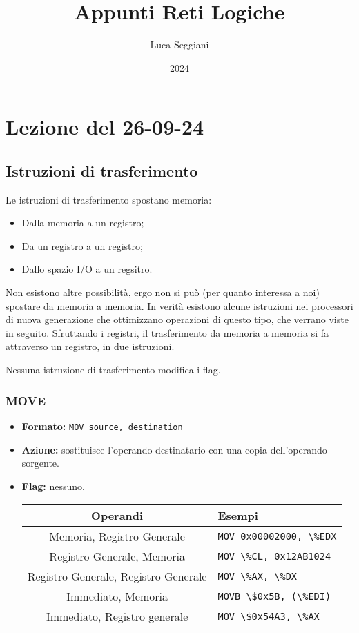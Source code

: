 \documentclass[a4paper,11pt]{article}
\title{Appunti Reti Logiche}
\author{Luca Seggiani}
\date{2024}
\begin{document}
\section{Lezione del 26-09-24}

\thispagestyle{empty}
\pagestyle{fancy}

\subsection{Istruzioni di trasferimento}
Le istruzioni di trasferimento spostano memoria:
\begin{itemize}
	\item Dalla memoria a un registro;
	\item Da un registro a un registro;
	\item Dallo spazio I/O a un regsitro.
\end{itemize}

Non esistono altre possibilità, ergo non si può (per quanto interessa a noi) spostare da memoria a memoria.
In verità esistono alcune istruzioni nei processori di nuova generazione che ottimizzano operazioni di questo tipo, che verrano viste in seguito.
Sfruttando i registri, il trasferimento da memoria a memoria si fa attraverso un registro, in due istruzioni.

Nessuna istruzione di trasferimento modifica i flag.

\subsubsection{MOVE}
\begin{itemize}
	\item \textbf{Formato:} \lstinline|MOV source, destination|
	\item \textbf{Azione:} sostituisce l'operando destinatario con una copia dell'operando sorgente.
	\item \textbf{Flag:} nessuno.

		\begin{table}[h!]
			\center {}
			\begin{tabular} { c | p{5cm} }
				\bfseries Operandi & \bfseries Esempi \\
				\hline 
				Memoria, Registro Generale & \lstinline|MOV 0x00002000, \%EDX| \\
				Registro Generale, Memoria & \lstinline|MOV \%CL, 0x12AB1024| \\
				Registro Generale, Registro Generale & \lstinline|MOV \%AX, \%DX| \\
				Immediato, Memoria & \lstinline|MOVB \$0x5B, (\%EDI)| \\ 
				Immediato, Registro generale & \lstinline|MOV \$0x54A3, \%AX|
			\end{tabular}
		\end{table}
\end{itemize}
\end{document}
